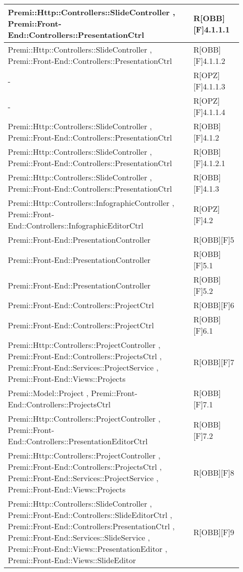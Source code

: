 \begin{table}[h]
	\begin{center}
		\begin{tabular}{|p{0.75\linewidth}|p{0.2\linewidth}|}
			\toprule
			Premi::Http::Controllers::SlideController , Premi::Front-End::Controllers::PresentationCtrl & R[OBB][F]4.1.1.1 \\
		\midrule
			Premi::Http::Controllers::SlideController , Premi::Front-End::Controllers::PresentationCtrl & R[OBB][F]4.1.1.2 \\
		\midrule
			- & R[OPZ][F]4.1.1.3 \\
		\midrule
			- & R[OPZ][F]4.1.1.4 \\
		\midrule
			Premi::Http::Controllers::SlideController , Premi::Front-End::Controllers::PresentationCtrl & R[OBB][F]4.1.2 \\
		\midrule
			Premi::Http::Controllers::SlideController , Premi::Front-End::Controllers::PresentationCtrl & R[OBB][F]4.1.2.1 \\
		\midrule
			Premi::Http::Controllers::SlideController , Premi::Front-End::Controllers::PresentationCtrl & R[OBB][F]4.1.3 \\
		\midrule
			Premi::Http::Controllers::InfographicController , Premi::Front-End::Controllers::InfographicEditorCtrl & R[OPZ][F]4.2 \\
		\midrule
			Premi::Front-End::PresentationController & R[OBB][F]5  \\
		\midrule
			Premi::Front-End::PresentationController & R[OBB][F]5.1 \\
		\midrule
			Premi::Front-End::PresentationController & R[OBB][F]5.2 \\
		\midrule
			Premi::Front-End::Controllers::ProjectCtrl & R[OBB][F]6 \\
		\midrule
			Premi::Front-End::Controllers::ProjectCtrl & R[OBB][F]6.1 \\
		\midrule
			Premi::Http::Controllers::ProjectController , Premi::Front-End::Controllers::ProjectsCtrl , Premi::Front-End::Services::ProjectService , Premi::Front-End::Views::Projects & R[OBB][F]7 \\
		\midrule
			Premi::Model::Project , Premi::Front-End::Controllers::ProjectsCtrl & R[OBB][F]7.1 \\
		\midrule
			Premi::Http::Controllers::ProjectController , Premi::Front-End::Controllers::PresentationEditorCtrl & R[OBB][F]7.2 \\
		\midrule
			Premi::Http::Controllers::ProjectController , Premi::Front-End::Controllers::ProjectsCtrl , Premi::Front-End::Services::ProjectService , Premi::Front-End::Views::Projects & R[OBB][F]8 \\
		\midrule
			Premi::Http::Controllers::SlideController , Premi::Front-End::Controllers::SlideEditorCtrl , Premi::Front-End::Controllers:PresentationCtrl , Premi::Front-End::Services::SlideService  , Premi::Front-End::Views::PresentationEditor , Premi::Front-End::Views::SlideEditor & R[OBB][F]9 \\
		\bottomrule
		\end{tabular}
	\end{center}
\end{table}
	

